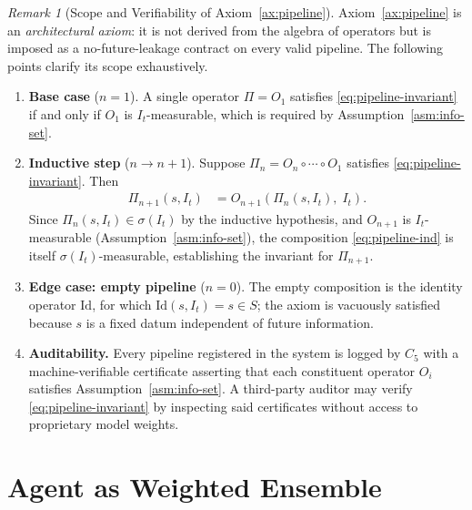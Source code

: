 \documentclass[12pt,openany]{book}
\newcommand{\calI}{\mathcal{I}}
\numberwithin{equation}{chapter}
\theoremstyle{plain}
\theoremstyle{definition}
\theoremstyle{remark}
\newtheorem{remark}[theorem]{Remark}
\numberwithin{equation}{chapter}
\theoremstyle{plain}
\newcommand{\calS}{\mathcal{S}}
\def\calI{I}%
\def\calS{S}%
\begin{document}
\begin{remark}[Scope and Verifiability of Axiom~\ref{ax:pipeline}]
\label{rem:pipeline-audit}
Axiom~\ref{ax:pipeline} is an \emph{architectural axiom}: it is not
derived from the algebra of operators but is imposed as a
no-future-leakage contract on every valid pipeline.  The following
points clarify its scope exhaustively.
\begin{enumerate}
  \item \textbf{Base case} ($n = 1$).
        A single operator $\Pi = O_1$ satisfies
        \eqref{eq:pipeline-invariant} if and only if $O_1$ is
        $\calI_t$-measurable, which is required by
        Assumption~\ref{asm:info-set}.

  \item \textbf{Inductive step} ($n \to n+1$).
        Suppose $\Pi_n = O_n \circ \cdots \circ O_1$ satisfies
        \eqref{eq:pipeline-invariant}.  Then
        \begin{align}
          \Pi_{n+1}(s, \calI_t)
          &= O_{n+1}\!\left(\Pi_n(s, \calI_t),\; \calI_t\right).
          \label{eq:pipeline-ind}
        \end{align}
        Since $\Pi_n(s, \calI_t) \in \sigma(\calI_t)$ by the
        inductive hypothesis, and $O_{n+1}$ is
        $\calI_t$-measurable (Assumption~\ref{asm:info-set}), the
        composition \eqref{eq:pipeline-ind} is itself
        $\sigma(\calI_t)$-measurable, establishing the invariant for
        $\Pi_{n+1}$.

  \item \textbf{Edge case: empty pipeline} ($n = 0$).
        The empty composition is the identity operator
        $\mathrm{Id}$, for which $\mathrm{Id}(s, \calI_t) = s
        \in \calS$; the axiom is vacuously satisfied because $s$ is
        a fixed datum independent of future information.

  \item \textbf{Auditability.}
        Every pipeline registered in the system is logged by $C_5$
        with a machine-verifiable certificate asserting that each
        constituent operator $O_i$ satisfies
        Assumption~\ref{asm:info-set}.  A third-party auditor may
        verify \eqref{eq:pipeline-invariant} by inspecting said
        certificates without access to proprietary model weights.
\end{enumerate}
\end{remark}

\section{Agent as Weighted Ensemble}
\end{document}
